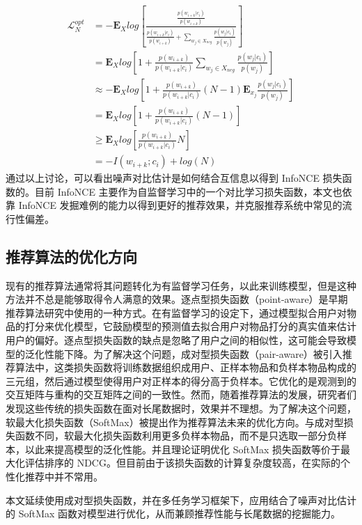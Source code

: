 \begin{equation}
    \begin{aligned}
        \mathcal{L}_N^{opt} & = -\mathbf{E}_X log [\frac{\frac{p(w_{i+k}|c_i)}{p(w_{i+k})}}{\frac{p(w_{i+k}|c_i)}{p(w_{i+k})} + \sum_{w_j \in X_{neg}}\frac{p(w_{j}|c_i)}{p(w_{j})} }] \\
        & = \mathbf{E}_X log [1 + \frac{p(w_{i+k})}{p(w_{i+k}|c_i)}\sum_{w_j \in X_{neg}}\frac{p(w_{j}|c_i)}{p(w_{j})}] \\
        & \approx -\mathbf{E}_X log [1 + \frac{p(w_{i+k})}{p(w_{i+k}|c_i)}(N-1)\mathbf{E}_{x_j}\frac{p(w_{j}|c_i)}{p(w_{j})}] \\
        & = \mathbf{E}_X log [1 + \frac{p(w_{i+k})}{p(w_{i+k}|c_i)}(N - 1)] \\
        & \geq \mathbf{E}_X log[ \frac{p(w_{i+k})}{p(w_{i+k}|c_i)} N] \\
        & = - I(w_{i+k};c_i) + log(N)
    \end{aligned}
\end{equation}
通过以上讨论，可以看出噪声对比估计是如何结合互信息以得到 InfoNCE 损失函数的。目前 InfoNCE 主要作为自监督学习中的一个对比学习损失函数，本文也依靠 InfoNCE 发掘难例的能力以得到更好的推荐效果，并克服推荐系统中常见的流行性偏差。

\subsection{推荐算法的优化方向}
现有的推荐算法通常将其问题转化为有监督学习任务，以此来训练模型，但是这种方法并不总是能够取得令人满意的效果。逐点型损失函数（point-aware）是早期推荐算法研究中使用的一种方式。在有监督学习的设定下，通过模型拟合用户对物品的打分来优化模型，它鼓励模型的预测值去拟合用户对物品打分的真实值来估计用户的偏好。逐点型损失函数的缺点是忽略了用户之间的相似性，这可能会导致模型的泛化性能下降。为了解决这个问题，成对型损失函数（pair-aware）被引入推荐算法中，这类损失函数将训练数据组织成用户、正样本物品和负样本物品构成的三元组，然后通过模型使得用户对正样本的得分高于负样本。它优化的是观测到的交互矩阵与重构的交互矩阵之间的一致性。然而，随着推荐算法的发展，研究者们发现这些传统的损失函数在面对长尾数据时，效果并不理想。为了解决这个问题，软最大化损失函数（SoftMax）被提出作为推荐算法未来的优化方向。与成对型损失函数不同，软最大化损失函数利用更多负样本物品，而不是只选取一部分负样本，以此来提高模型的泛化性能。并且理论证明优化 SoftMax 损失函数等价于最大化评估排序的 NDCG\cite{2022_gnn_rs}。但目前由于该损失函数的计算复杂度较高，在实际的个性化推荐中并不常用。

本文延续使用成对型损失函数，并在多任务学习框架下，应用结合了噪声对比估计的 SoftMax 函数对模型进行优化，从而兼顾推荐性能与长尾数据的挖掘能力。

